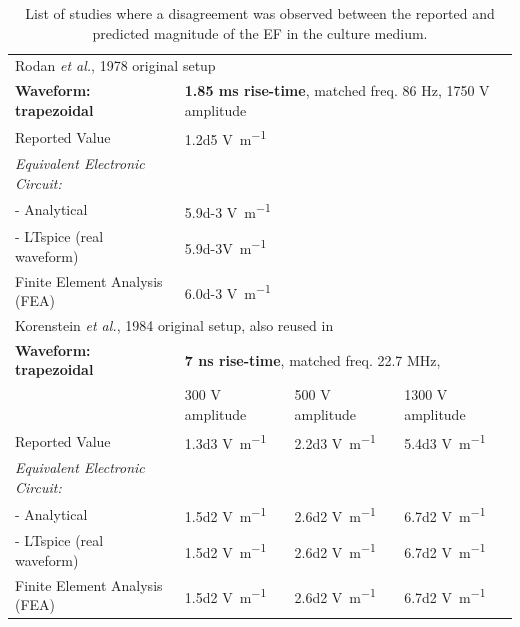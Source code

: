 \begin{table}
\caption{List of studies where a disagreement was observed between the reported and predicted magnitude of the \acs{EF} in the culture medium.}
\bigskip
\footnotesize
\centering
\begin{tabularx}{405px}{l l l l} \toprule[0.15em]
\multicolumn{4}{l}{Rodan \textit{et al.}, 1978 \cite{Rodan1978-yu} original setup}\\ \cmidrule(l){1-4}
\textbf{Waveform: trapezoidal} & \multicolumn{3}{l}{\textbf{1.85 \si{\milli\second} rise-time}, matched freq. 86 \si{\hertz}, 1750 \si{\volt} amplitude} \\
Reported Value &\multicolumn{3}{l}{\num{1.2d5} \si{\volt\per\meter}} \\
\textit{Equivalent Electronic Circuit:} &\multicolumn{3}{l}{} \\
- Analytical &\multicolumn{3}{l}{\num{5.9d-3} \si{\volt\per\meter}} \\
- LTspice (real waveform) &\multicolumn{3}{l}{\num{5.9d-3}\si{\volt\per\meter}} \\
Finite Element Analysis (FEA) &\multicolumn{3}{l}{\num{6.0d-3} \si{\volt\per\meter}} \\ \cmidrule(l){1-4}


\multicolumn{4}{l}{Korenstein \textit{et al.}, 1984 \cite{Korenstein1984-qb} original setup, also reused in \cite{Laub1984-qm, Danon1984-eu, Binderman1985-mh, Ozawa1989-uz}}\\ \cmidrule(l){1-4}
\textbf{Waveform: trapezoidal} &\multicolumn{3}{l}{\textbf{7 \si{\nano\second} rise-time}, matched freq. 22.7 \si{\mega\hertz},} \\
&300 \si{\volt} amplitude & 500 \si{\volt} amplitude & 1300 \si{\volt} amplitude \\
Reported Value &\num{1.3d3} \si{\volt\per\meter} &\num{2.2d3} \si{\volt\per\meter}	&\num{5.4d3} \si{\volt\per\meter} \\
\textit{Equivalent Electronic Circuit:} & & & \\
- Analytical &\num{1.5d2} \si{\volt\per\meter} &\num{2.6d2} \si{\volt\per\meter} &\num{6.7d2} \si{\volt\per\meter} \\
- LTspice (real waveform) &\num{1.5d2} \si{\volt\per\meter} &\num{2.6d2} \si{\volt\per\meter}	&\num{6.7d2} \si{\volt\per\meter} \\
Finite Element Analysis (FEA) &\num{1.5d2} \si{\volt\per\meter} &\num{2.6d2} \si{\volt\per\meter}	&\num{6.7d2} \si{\volt\per\meter} \\ \cmidrule(l){1-4}



\end{tabularx}
\end{table}

